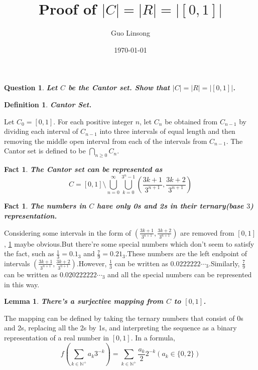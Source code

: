 \documentclass{article}
\title{Proof of $|C|=|R|=|[0,1]|$}
\author{Guo Linsong}
\date{\today}
\newtheorem{lemma}[theorem]{Lemma}
\newtheorem{fact}[theorem]{Fact}
\newtheorem{definition}[theorem]{Definition}
\newtheorem{question}[theorem]{Question}
\begin{document}
    \maketitle

\begin{question}\label{main}
\textbf{Let $C$ be the Cantor set. Show that $|C| = |R| = |[0, 1]|$.}
\end{question}

\begin{definition}\label{cantor}
\textbf{Cantor Set.}
\end{definition}
Let $C_0 = [0, 1]$. For each positive integer $n$, let $C_n$ be obtained from $C_{n-1}$ by dividing each interval of $C_{n-1}$ into three intervals of equal length and then removing the middle open interval from each of the intervals from $C_{n-1}$. The Cantor set is defined to be $\bigcap_{n\geq0}C_n$.

\begin{fact}\label{fact3}
\textbf{The Cantor set can be represented as
$$C=[0,1]\setminus\bigcup_{n=0}^{\infty}\bigcup_{k=0}^{3^n-1}(\frac{3k+1}{3^{n+1}},\frac{3k+2}{3^{n+1}})$$}
\end{fact}


\begin{fact}\label{fact4}
\textbf{The numbers in $C$ have only 0s and 2s in their ternary(base $3$) representation.}
\end{fact}
 Considering some intervals in the form of $(\frac{3k+1}{3^{n+1}},\frac{3k+2}{3^{n+1}})$ are removed from $[0,1]$, \cref{fact4} maybe obvious.But there're some special numbers which don't seem to satisfy the fact, such as $\frac{1}{3}=0.1_{3}$ and $\frac{7}{9} = 0.21_{3}$.These numbers are the left endpoint of intervals  $(\frac{3k+1}{3^{n+1}},\frac{3k+2}{3^{n+1}})$.However, $\frac{1}{3}$ can be written as $0.0222222\cdots_{3}$.Similarly, $\frac{7}{9}$ can be written as $0.020222222\cdots_{3}$ and all the special numbers can be represented in this way.

\begin{lemma}\label{lemma5}
\textbf{There's a surjective mapping from $C$ to $[0,1]$.}
\end{lemma}
The mapping can be defined by taking the ternary numbers that consist of 0s and 2s, replacing all the 2s by 1s, and interpreting the sequence as a binary representation of a real number in $[0,1]$. In a formula,
$$f(\sum_{k\in\mathbb{N}^{+}}a_k3^{-k})=\sum_{k\in\mathbb{N}^{+}}\frac{a_k}{2}2^{-k} (a_k\in\{0,2\})$$
\end{document}
